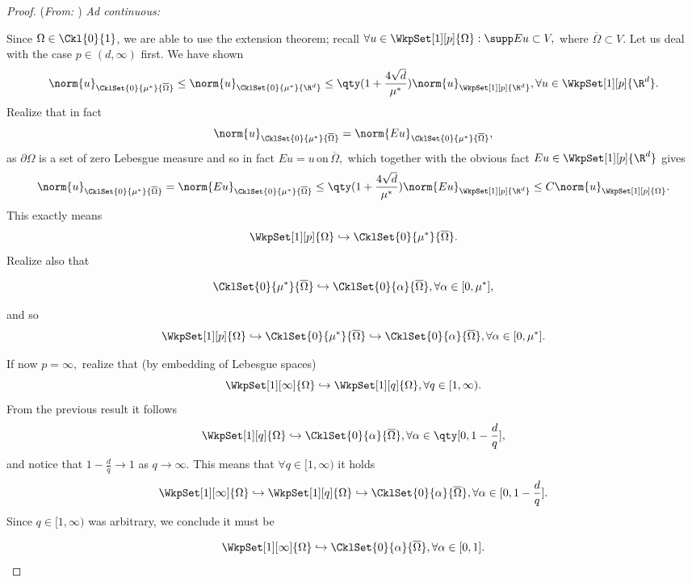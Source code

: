 \begin{proof}(\textit{From: \cite{bulicekUvodModerniTeorie2018}})
    \textit{Ad continuous:}

    Since $\Omega \in \Ckl{0}{1}$, we are able to use the extension theorem; recall $\forall u \in \WkpSet[1][p]{\Omega}: \supp Eu \subset V,$ where $\overline{\Omega} \subset V.$ Let us deal with the case $p \in (d, \infty)$ first. We have shown
    \[
	    \norm{u}_{\CklSet{0}{\mu^{*}}{\overline{\Omega}}} \leq \norm{u}_{\CklSet{0}{\mu^{*}}{\R^{d}}} \leq \qty(1+ \frac{4 \sqrt{d}}{\mu^{*}})\norm{u}_{\WkpSet[1][p]{\R^{d}}}, \forall u \in \WkpSet[1][p]{\R^{d}}.
    \]
    Realize that in fact
    \[
	    \norm{u}_{\CklSet{0}{\mu^{*}}{\overline{\Omega}}} = \norm{Eu}_{\CklSet{0}{\mu^{*}}{\overline{\Omega}}},
    \]
    as $\partial \Omega$ is a set of zero Lebesgue measure and so in fact $Eu = u \, \text{on} \, \overline{\Omega},$ which together with the obvious fact $Eu \in \WkpSet[1][p]{\R^{d}}$ gives
    \[
	    \norm{u}_{\CklSet{0}{\mu^{*}}{\overline{\Omega}}} = \norm{Eu}_{\CklSet{0}{\mu^{*}}{\overline{\Omega}}} \leq \qty(1 + \frac{4 \sqrt{d}}{\mu^{*}})\norm{Eu}_{\WkpSet[1][p]{\R^{d}}} \leq C \norm{u}_{\WkpSet[1][p]{\Omega}}.
    \]
    This exactly means
    \[
	    \WkpSet[1][p]{\Omega} \hookrightarrow \CklSet{0}{\mu^{*}}{\overline{\Omega}}.
    \]
    Realize also that

    \[
	    \CklSet{0}{\mu^{*}}{\overline{\Omega}} \hookrightarrow \CklSet{0}{\alpha}{\overline{\Omega}}, \forall \alpha \in [0,\mu^{*}],
    \]

    and so
    \[
	    \WkpSet[1][p]{\Omega} \hookrightarrow \CklSet{0}{\mu^{*}}{\overline{\Omega}} \hookrightarrow \CklSet{0}{\alpha}{\overline{\Omega}}, \forall \alpha \in [0,\mu^{*}].
    \]

    If now $p = \infty,$ realize that (by embedding of Lebesgue spaces)
    \[
	    \WkpSet[1][\infty]{\Omega} \hookrightarrow \WkpSet[1][q]{\Omega}, \forall q \in [1, \infty).
    \]
    From the previous result it follows
    \[
	    \WkpSet[1][q]{\Omega} \hookrightarrow \CklSet{0}{\alpha}{\overline{\Omega}}, \forall \alpha \in \qty[0, 1 - \frac{d}{q}],
    \]
    and notice that $1- \frac{d}{q} \to 1$ as $q \to \infty.$ This means that $\forall q \in [1,\infty)$ it holds
    \[
	    \WkpSet[1][\infty]{\Omega} \hookrightarrow \WkpSet[1][q]{\Omega} \hookrightarrow \CklSet{0}{\alpha}{\overline{\Omega}}, \forall \alpha \in [0, 1- \frac{d}{q}].
    \]
    Since $q \in [1, \infty)$ was arbitrary, we conclude it must be


    \[
	    \WkpSet[1][\infty]{\Omega} \hookrightarrow \CklSet{0}{\alpha}{\overline{\Omega}}, \forall \alpha \in [0,1].
    \]



\end{proof}
